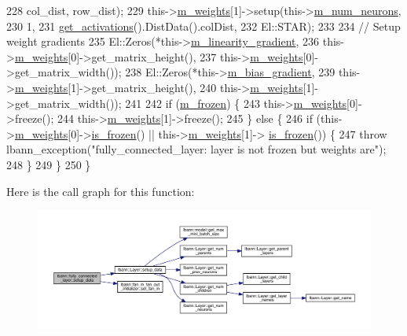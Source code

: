 \begin{DoxyCode}
228                               col\_dist, row\_dist);
229     this->\hyperlink{classlbann_1_1Layer_a7954e30fbf9100a6ba4b56d02767a469}{m\_weights}[1]->setup(this->\hyperlink{classlbann_1_1Layer_a6b5ebc8a7d9329d8a773ed787e7b41d8}{m\_num\_neurons},
230                               1,
231                               \hyperlink{classlbann_1_1Layer_a1134b1a4385af199d7272c5aa827fa99}{get\_activations}().DistData().colDist,
232                               El::STAR);
233 
234     \textcolor{comment}{// Setup weight gradients}
235     El::Zeros(*this->\hyperlink{classlbann_1_1fully__connected__layer_ab80f9cb94662ce4d90aa6d8b5cfa0803}{m\_linearity\_gradient},
236               this->\hyperlink{classlbann_1_1Layer_a7954e30fbf9100a6ba4b56d02767a469}{m\_weights}[0]->get\_matrix\_height(),
237               this->\hyperlink{classlbann_1_1Layer_a7954e30fbf9100a6ba4b56d02767a469}{m\_weights}[0]->get\_matrix\_width());
238     El::Zeros(*this->\hyperlink{classlbann_1_1fully__connected__layer_a6510917c573378f40789a1d16db22b4e}{m\_bias\_gradient},
239               this->\hyperlink{classlbann_1_1Layer_a7954e30fbf9100a6ba4b56d02767a469}{m\_weights}[1]->get\_matrix\_height(),
240               this->\hyperlink{classlbann_1_1Layer_a7954e30fbf9100a6ba4b56d02767a469}{m\_weights}[1]->get\_matrix\_width());
241 
242     \textcolor{keywordflow}{if} (\hyperlink{classlbann_1_1Layer_afdc60df9731a3ecdeeeb8175fa483676}{m\_frozen}) \{
243       this->\hyperlink{classlbann_1_1Layer_a7954e30fbf9100a6ba4b56d02767a469}{m\_weights}[0]->freeze();
244       this->\hyperlink{classlbann_1_1Layer_a7954e30fbf9100a6ba4b56d02767a469}{m\_weights}[1]->freeze();
245     \} \textcolor{keywordflow}{else} \{
246       \textcolor{keywordflow}{if} (this->\hyperlink{classlbann_1_1Layer_a7954e30fbf9100a6ba4b56d02767a469}{m\_weights}[0]->\hyperlink{classlbann_1_1Layer_af3c0f9f32eb631f4fdf34ad040ef8637}{is\_frozen}() || this->\hyperlink{classlbann_1_1Layer_a7954e30fbf9100a6ba4b56d02767a469}{m\_weights}[1]->
      \hyperlink{classlbann_1_1Layer_af3c0f9f32eb631f4fdf34ad040ef8637}{is\_frozen}()) \{
247         \textcolor{keywordflow}{throw} lbann\_exception(\textcolor{stringliteral}{"fully\_connected\_layer: layer is not frozen but weights are"});
248       \}
249     \}
250   \}
\end{DoxyCode}
Here is the call graph for this function\+:\nopagebreak
\begin{figure}[H]
\begin{center}
\leavevmode
\includegraphics[width=350pt]{classlbann_1_1fully__connected__layer_aec4298146845489597126503177d3127_cgraph}
\end{center}
\end{figure}
